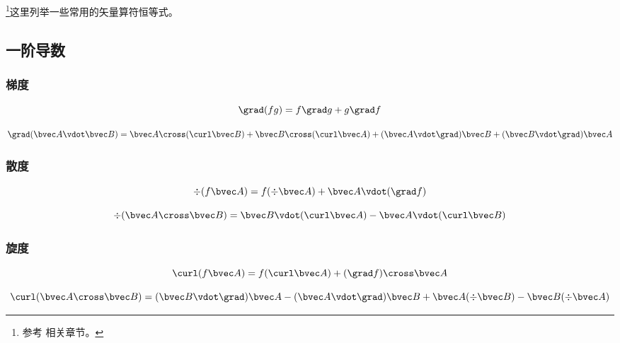 
\begin{issues}
\issueAbstract
\end{issues}



\footnote{参考 \cite{GriffE} 相关章节。}这里列举一些常用的矢量算符恒等式。

\subsection{一阶导数}
\subsubsection{梯度}
\begin{equation}\label{eq_VopEq_2}
\grad (fg) = f\grad g + g \grad f
\end{equation}

\begin{equation}
\grad (\bvec A \vdot \bvec B) = \bvec A \cross (\curl \bvec B) + \bvec B \cross (\curl \bvec A) + (\bvec A \vdot \grad) \bvec B + (\bvec B \vdot \grad) \bvec A
\end{equation}

\subsubsection{散度}

\begin{equation}\label{eq_VopEq_1}
\div (f \bvec A) = f (\div \bvec A) + \bvec A \vdot (\grad f)
\end{equation}

\begin{equation}\label{eq_VopEq_4}
\div (\bvec A \cross \bvec B) = \bvec B \vdot (\curl \bvec A) - \bvec A \vdot (\curl \bvec B)
\end{equation}

\subsubsection{旋度}
\begin{equation}\label{eq_VopEq_3}
\curl(f\bvec A) = f (\curl\bvec A) + (\grad f) \cross\bvec A
\end{equation}

\begin{equation}\label{eq_VopEq_6}
\curl (\bvec A \cross \bvec B) = (\bvec B \vdot \grad) \bvec A - (\bvec A \vdot \grad) \bvec B + \bvec A (\div \bvec B) - \bvec B (\div \bvec A)
\end{equation}

